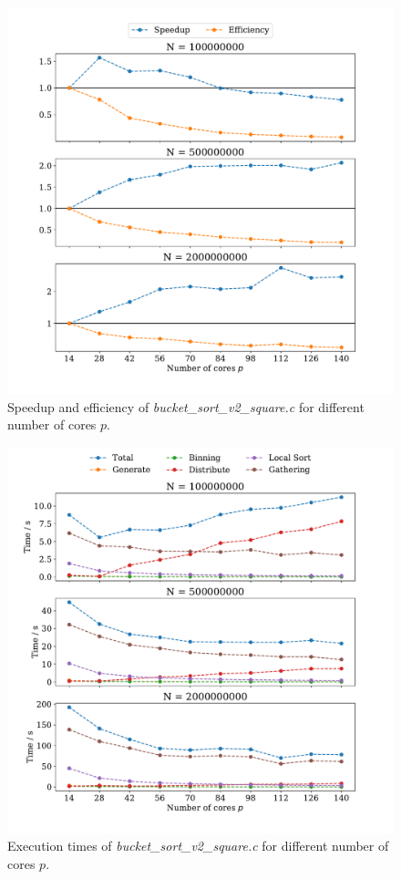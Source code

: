 \documentclass[a4paper, 11pt]{article}
\begin{document}
\begin{figure}
  \centering
  \includegraphics[width=\textwidth]{../part_2/plot/v2_square_speedup.pdf}
  \caption{Speedup and efficiency of \textit{bucket\_sort\_v2\_square.c} for
  different number of cores $p$.}
  \label{fig:p2_v2_square_speedup}
\end{figure}
\begin{figure}
  \centering
  \includegraphics[width=\textwidth]{../part_2/plot/v2_square_times.pdf}
  \caption{Execution times of \textit{bucket\_sort\_v2\_square.c} for different
  number of cores $p$.}
  \label{fig:p2_v2_square_times}
\end{figure}
\FloatBarrier
\end{document}

